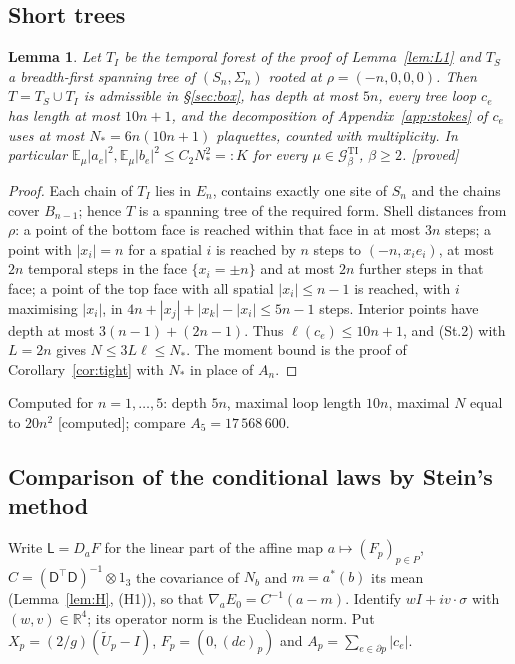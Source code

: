 \documentclass[11pt,a4paper]{article}
\theoremstyle{plain}
\newtheorem{lemma}[theorem]{Lemma}
\theoremstyle{definition}
\theoremstyle{remark}
\numberwithin{equation}{section}
\newcommand{\R}{\mathbb{R}}
\newcommand{\E}{\mathbb{E}}
\newcommand{\st}[1]{\textsf{[#1]}}
\newcommand{\cG}{\mathcal{G}}
\newcommand{\Tg}{\widetilde U}
\begin{document}
\subsection{Short trees}
\begin{lemma}\label{lem:shorttree}
Let $T_I$ be the temporal forest of the proof of Lemma~\ref{lem:L1} and $T_S$ a breadth-first spanning tree of $(S_n,\Sigma_n)$ rooted at
$\rho=(-n,0,0,0)$. Then $T=T_S\cup T_I$ is admissible in \S\ref{sec:box}, has depth at most $5n$, every tree loop $c_e$ has length at
most $10n+1$, and the decomposition of Appendix~\ref{app:stokes} of $c_e$ uses at most $N_*=6n(10n+1)$ plaquettes, counted with
multiplicity. In particular $\E_\mu|a_e|^2,\E_\mu|b_e|^2\le C_2N_*^2=:K$ for every $\mu\in\cG^{\mathrm{TI}}_\beta$, $\beta\ge2$. \st{proved}
\end{lemma}
\begin{proof}
Each chain of $T_I$ lies in $E_n$, contains exactly one site of $S_n$ and the chains cover $B_{n-1}$; hence $T$ is a spanning tree of the
required form. Shell distances from $\rho$: a point of the bottom face is reached within that face in at most $3n$ steps; a point with
$|x_i|=n$ for a spatial $i$ is reached by $n$ steps to $(-n,x_ie_i)$, at most $2n$ temporal steps in the face $\{x_i=\pm n\}$ and at most
$2n$ further steps in that face; a point of the top face with all spatial $|x_i|\le n-1$ is reached, with $i$ maximising $|x_i|$, in
$4n+|x_j|+|x_k|-|x_i|\le5n-1$ steps. Interior points have depth at most $3(n-1)+(2n-1)$. Thus $\ell(c_e)\le10n+1$, and (St.2) with $L=2n$
gives $N\le3L\ell\le N_*$. The moment bound is the proof of Corollary~\ref{cor:tight} with $N_*$ in place of $A_n$.
\end{proof}
Computed for $n=1,\dots,5$: depth $5n$, maximal loop length $10n$, maximal $N$ equal to $20n^2$ \st{computed}; compare $A_5=17\,568\,600$.

\subsection{Comparison of the conditional laws by Stein's method}
Write $\mathsf L=D_aF$ for the linear part of the affine map $a\mapsto(F_p)_{p\in P}$, $C=(\mathsf D^\top\mathsf D)^{-1}\otimes1_3$ the covariance of $N_b$ and
$m=a^*(b)$ its mean (Lemma~\ref{lem:H}, (H1)), so that $\nabla_aE_0=C^{-1}(a-m)$. Identify $wI+iv\cdot\sigma$ with $(w,v)\in\R^4$; its operator
norm is the Euclidean norm. Put $X_p=(2/g)(\Tg_p-I)$, $F_p=(0,(dc)_p)$ and $A_p=\sum_{e\in\partial p}|c_e|$.
\end{document}
